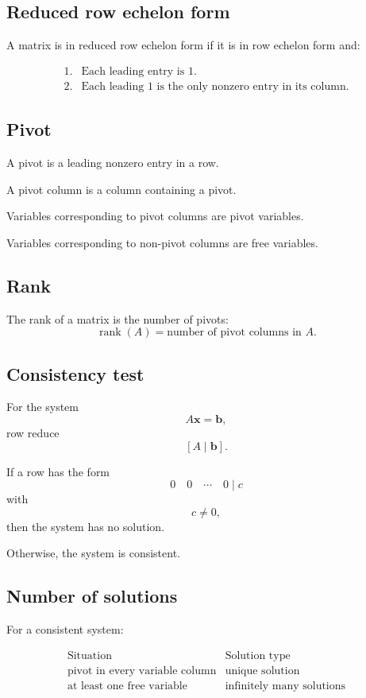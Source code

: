 \subsection*{Reduced row echelon form}

A matrix is in reduced row echelon form if it is in row echelon form and:

\[
\begin{array}{ll}
1. & \text{Each leading entry is }1.\\[1mm]
2. & \text{Each leading }1\text{ is the only nonzero entry in its column.}
\end{array}
\]

\subsection*{Pivot}

A pivot is a leading nonzero entry in a row.

A pivot column is a column containing a pivot.

Variables corresponding to pivot columns are pivot variables.

Variables corresponding to non-pivot columns are free variables.

\subsection*{Rank}

The rank of a matrix is the number of pivots:
\[
\boxed{
    \operatorname{rank}(A)=\text{number of pivot columns in }A.
}
\]

\subsection*{Consistency test}

For the system
\[
    A\mathbf x=\mathbf b,
\]
row reduce
\[
    [A\mid \mathbf b].
\]

If a row has the form
\[
\boxed{
    0\quad 0\quad \cdots\quad 0\mid c
}
\]
with
\[
    c\ne0,
\]
then the system has no solution.

Otherwise, the system is consistent.

\subsection*{Number of solutions}

For a consistent system:

\[
\begin{array}{c|c}
\text{Situation} & \text{Solution type} \\ \hline
\text{pivot in every variable column} & \text{unique solution}\\[1mm]
\text{at least one free variable} & \text{infinitely many solutions}
\end{array}
\]

